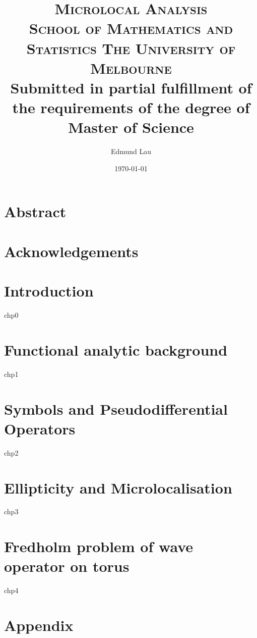 \documentclass[12pt, twoside]{book}
\title{    
    \textsc{Microlocal Analysis} \\ [5em]
    \textsc{\Large School of Mathematics and Statistics The University of Melbourne} \\ [5em]
    {\large Submitted in partial fulfillment of the requirements of the degree of Master of Science} \\
}
\author{Edmund Lau}
\date{\today}
\begin{document}
\maketitle



\chapter*{Abstract}


\chapter*{Acknowledgements}

\tableofcontents
\chapter{Introduction}
{chp0}


\chapter{Functional analytic background}
{chp1}

\chapter{Symbols and Pseudodifferential Operators}
{chp2}

\chapter{Ellipticity and Microlocalisation}
{chp3}

\chapter{Fredholm problem of wave operator on torus}
{chp4}

\appendix
\chapter{Appendix}

%
\end{document}
